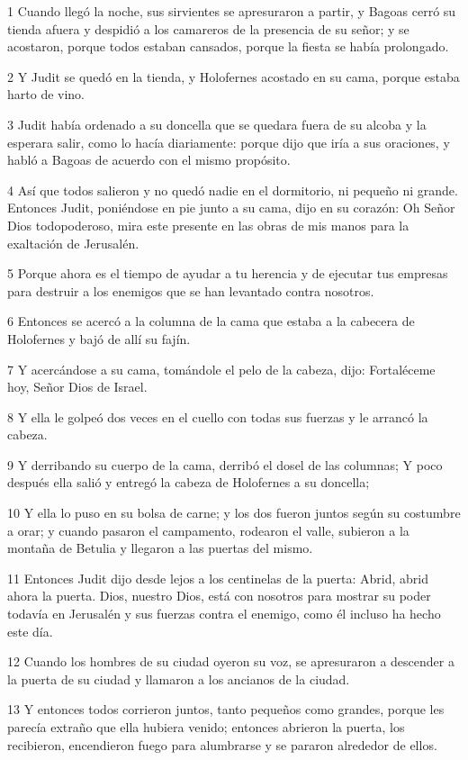 \par 1 Cuando llegó la noche, sus sirvientes se apresuraron a partir, y Bagoas cerró su tienda afuera y despidió a los camareros de la presencia de su señor; y se acostaron, porque todos estaban cansados, porque la fiesta se había prolongado.
\par 2 Y Judit se quedó en la tienda, y Holofernes acostado en su cama, porque estaba harto de vino.
\par 3 Judit había ordenado a su doncella que se quedara fuera de su alcoba y la esperara salir, como lo hacía diariamente: porque dijo que iría a sus oraciones, y habló a Bagoas de acuerdo con el mismo propósito.
\par 4 Así que todos salieron y no quedó nadie en el dormitorio, ni pequeño ni grande. Entonces Judit, poniéndose en pie junto a su cama, dijo en su corazón: Oh Señor Dios todopoderoso, mira este presente en las obras de mis manos para la exaltación de Jerusalén.
\par 5 Porque ahora es el tiempo de ayudar a tu herencia y de ejecutar tus empresas para destruir a los enemigos que se han levantado contra nosotros.
\par 6 Entonces se acercó a la columna de la cama que estaba a la cabecera de Holofernes y bajó de allí su fajín.
\par 7 Y acercándose a su cama, tomándole el pelo de la cabeza, dijo: Fortaléceme hoy, Señor Dios de Israel.
\par 8 Y ella le golpeó dos veces en el cuello con todas sus fuerzas y le arrancó la cabeza.
\par 9 Y derribando su cuerpo de la cama, derribó el dosel de las columnas; Y poco después ella salió y entregó la cabeza de Holofernes a su doncella;
\par 10 Y ella lo puso en su bolsa de carne; y los dos fueron juntos según su costumbre a orar; y cuando pasaron el campamento, rodearon el valle, subieron a la montaña de Betulia y llegaron a las puertas del mismo.
\par 11 Entonces Judit dijo desde lejos a los centinelas de la puerta: Abrid, abrid ahora la puerta. Dios, nuestro Dios, está con nosotros para mostrar su poder todavía en Jerusalén y sus fuerzas contra el enemigo, como él incluso ha hecho este día.
\par 12 Cuando los hombres de su ciudad oyeron su voz, se apresuraron a descender a la puerta de su ciudad y llamaron a los ancianos de la ciudad.
\par 13 Y entonces todos corrieron juntos, tanto pequeños como grandes, porque les parecía extraño que ella hubiera venido; entonces abrieron la puerta, los recibieron, encendieron fuego para alumbrarse y se pararon alrededor de ellos.

